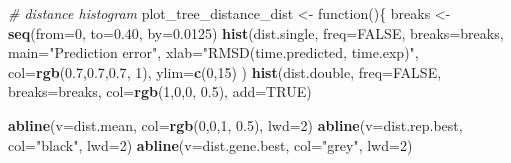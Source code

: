 \documentclass[]{article}
\newenvironment{Shaded}{\begin{snugshade}}{\end{snugshade}}
\newcommand{\KeywordTok}[1]{\textcolor[rgb]{0.13,0.29,0.53}{\textbf{{#1}}}}
\newcommand{\DataTypeTok}[1]{\textcolor[rgb]{0.13,0.29,0.53}{{#1}}}
\newcommand{\DecValTok}[1]{\textcolor[rgb]{0.00,0.00,0.81}{{#1}}}
\newcommand{\FloatTok}[1]{\textcolor[rgb]{0.00,0.00,0.81}{{#1}}}
\newcommand{\StringTok}[1]{\textcolor[rgb]{0.31,0.60,0.02}{{#1}}}
\newcommand{\CommentTok}[1]{\textcolor[rgb]{0.56,0.35,0.01}{\textit{{#1}}}}
\newcommand{\OtherTok}[1]{\textcolor[rgb]{0.56,0.35,0.01}{{#1}}}
\newcommand{\NormalTok}[1]{{#1}}
\begin{document}
\begin{Shaded}
\begin{Highlighting}[]
\CommentTok{# distance histogram}
\NormalTok{plot_tree_distance_dist <-}\StringTok{ }\NormalTok{function()\{}
  \NormalTok{breaks <-}\StringTok{ }\KeywordTok{seq}\NormalTok{(}\DataTypeTok{from=}\DecValTok{0}\NormalTok{, }\DataTypeTok{to=}\FloatTok{0.40}\NormalTok{, }\DataTypeTok{by=}\FloatTok{0.0125}\NormalTok{)}
  \KeywordTok{hist}\NormalTok{(dist.single, }\DataTypeTok{freq=}\OtherTok{FALSE}\NormalTok{, }\DataTypeTok{breaks=}\NormalTok{breaks,}
      \DataTypeTok{main=}\StringTok{"Prediction error"}\NormalTok{,}
      \DataTypeTok{xlab=}\StringTok{"RMSD(time.predicted, time.exp)"}\NormalTok{,}
      \DataTypeTok{col=}\KeywordTok{rgb}\NormalTok{(}\FloatTok{0.7}\NormalTok{,}\FloatTok{0.7}\NormalTok{,}\FloatTok{0.7}\NormalTok{, }\DecValTok{1}\NormalTok{),}
      \DataTypeTok{ylim=}\KeywordTok{c}\NormalTok{(}\DecValTok{0}\NormalTok{,}\DecValTok{15}\NormalTok{)}
  \NormalTok{)}
  \KeywordTok{hist}\NormalTok{(dist.double, }\DataTypeTok{freq=}\OtherTok{FALSE}\NormalTok{, }\DataTypeTok{breaks=}\NormalTok{breaks,}
       \DataTypeTok{col=}\KeywordTok{rgb}\NormalTok{(}\DecValTok{1}\NormalTok{,}\DecValTok{0}\NormalTok{,}\DecValTok{0}\NormalTok{, }\FloatTok{0.5}\NormalTok{), }\DataTypeTok{add=}\OtherTok{TRUE}\NormalTok{)}
  
  \KeywordTok{abline}\NormalTok{(}\DataTypeTok{v=}\NormalTok{dist.mean, }\DataTypeTok{col=}\KeywordTok{rgb}\NormalTok{(}\DecValTok{0}\NormalTok{,}\DecValTok{0}\NormalTok{,}\DecValTok{1}\NormalTok{, }\FloatTok{0.5}\NormalTok{), }\DataTypeTok{lwd=}\DecValTok{2}\NormalTok{)}
  \KeywordTok{abline}\NormalTok{(}\DataTypeTok{v=}\NormalTok{dist.rep.best, }\DataTypeTok{col=}\StringTok{"black"}\NormalTok{, }\DataTypeTok{lwd=}\DecValTok{2}\NormalTok{)}
  \KeywordTok{abline}\NormalTok{(}\DataTypeTok{v=}\NormalTok{dist.gene.best, }\DataTypeTok{col=}\StringTok{"grey"}\NormalTok{, }\DataTypeTok{lwd=}\DecValTok{2}\NormalTok{)}
  

\end{Highlighting}
\end{Shaded}
\end{document}
